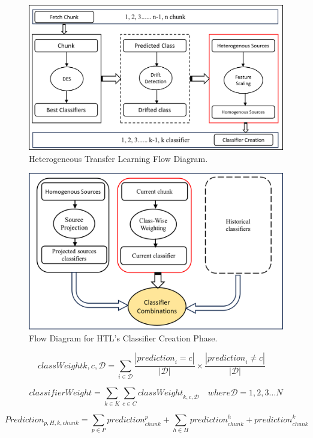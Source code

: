 \begin{figure}[!ht]
	\centering
	\includegraphics[width=0.85\linewidth]{6_transfer_learning/figures/alg1.png}
	\caption{Heterogeneous Transfer Learning Flow Diagram.}
	\label{fig:6_alg1}
\end{figure}
\begin{figure}[!ht]
	\centering
	\includegraphics[width=0.85\linewidth]{6_transfer_learning/figures/alg2.png}
	\caption{Flow Diagram for HTL's Classifier Creation Phase.}
	\label{fig:6_alg2}
\end{figure}

\begin{equation}
	\label{eq:6_eq_1}
	{classWeight}{k,c,\mathcal{D}} = \sum_{i \in \mathcal{D}} \frac{|{prediction}_i = c|}{|\mathcal{D}|} \times \frac{|{prediction}_i \neq c|}{|\mathcal{D}|} \quad
\end{equation}

\begin{equation}
	\label{eq:6_eq_2}
	{classifierWeight} = \sum_{k \in K} \sum_{c \in C} {classWeight}_{k,c,\mathcal{D}} \quad where \mathcal{D} = 1,2,3 \dots N
\end{equation}

\begin{equation}
	\label{eq:6_eq_3}
    {Prediction}_{p,H,k,chunk} = \sum_{p \in P} {{prediction}^{p}_{chunk}} +  \sum_{h \in H} {{prediction}^{h}_{chunk}} + {prediction}^{k}_{chunk}
\end{equation}


